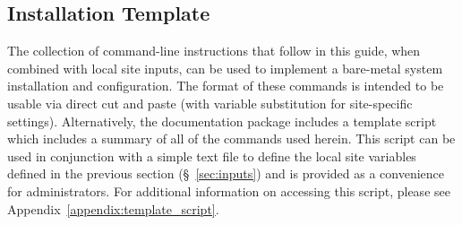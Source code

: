 \subsection{Installation Template}
The collection of command-line instructions that follow in this guide, when
combined with local site inputs, can be used to implement a 
bare-metal system installation and configuration. The format of these commands
is intended to be usable via direct cut and paste (with variable substitution
for site-specific settings). Alternatively, the \FSP{} documentation package
includes a template script which includes a summary of all of the commands used
herein. This script can be used in conjunction with a simple text file to
define the local site variables defined in the previous section
(\S~\ref{sec:inputs}) and is provided as a convenience for administrators.  For
additional information on accessing this script, please see
Appendix~\ref{appendix:template_script}.








